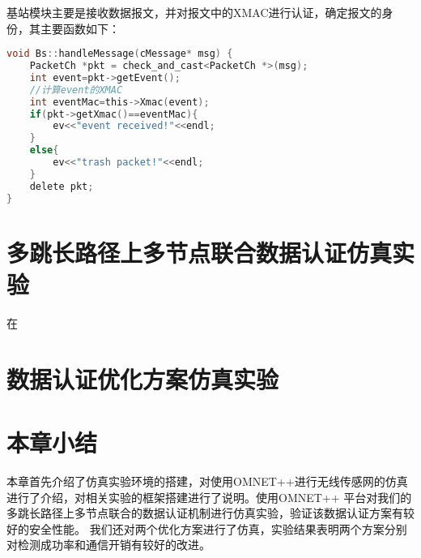 基站模块主要是接收数据报文，并对报文中的XMAC进行认证，确定报文的身份，其主要函数如下：
\begin{lstlisting}[language=C]
void Bs::handleMessage(cMessage* msg) {
    PacketCh *pkt = check_and_cast<PacketCh *>(msg);
    int event=pkt->getEvent();
    //计算event的XMAC
    int eventMac=this->Xmac(event);
    if(pkt->getXmac()==eventMac){
        ev<<"event received!"<<endl;
    }
    else{
        ev<<"trash packet!"<<endl;
    }
    delete pkt;
}
\end{lstlisting}
\section{多跳长路径上多节点联合数据认证仿真实验}
在



\section{数据认证优化方案仿真实验}





\section{本章小结}
本章首先介绍了仿真实验环境的搭建，对使用OMNET++进行无线传感网的仿真进行了介绍，对相关实验的框架搭建进行了说明。使用OMNET++ 平台对我们的多跳长路径上多节点联合的数据认证机制进行仿真实验，验证该数据认证方案有较好的安全性能。
我们还对两个优化方案进行了仿真，实验结果表明两个方案分别对检测成功率和通信开销有较好的改进。
